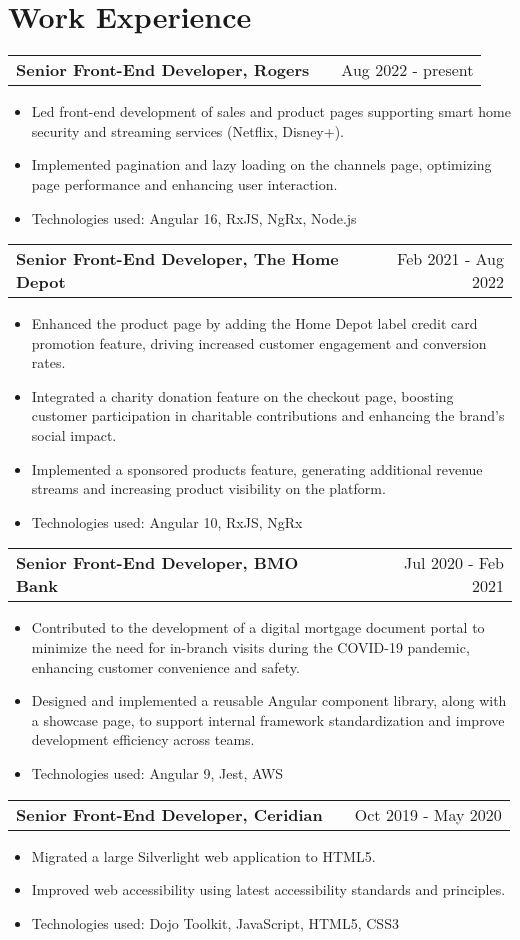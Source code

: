 \documentclass[a4paper,12pt]{article}
\makeatletter
\newenvironment{joblong}[2]
    {
    \begin{tabularx}{\linewidth}{@{}l X r@{}}
    \textbf{#1} & \hfill &  #2 \\[3.75pt]
    \end{tabularx}
    \begin{minipage}[t]{\linewidth}
    \begin{itemize}[nosep,after=\strut, leftmargin=1em, itemsep=3pt,label=--]
    }
    {
    \end{itemize}
    \end{minipage}    
    }
\makeatother
\begin{document}
\section{Work Experience}

\begin{joblong}{Senior Front-End Developer, Rogers}{Aug 2022 - present}
\item Led front-end development of sales and product pages supporting smart home security and streaming services (Netflix, Disney+).
\item Implemented pagination and lazy loading on the channels page, optimizing page performance and enhancing user interaction.
\item Technologies used:  Angular 16, RxJS, NgRx, Node.js
\end{joblong}

\begin{joblong}{Senior Front-End Developer, The Home Depot}{Feb 2021 - Aug 2022}
\item Enhanced the product page by adding the Home Depot label credit card promotion feature, driving increased customer engagement and conversion rates.
\item Integrated a charity donation feature on the checkout page, boosting customer participation in charitable contributions and enhancing the brand's social impact. 
\item Implemented a sponsored products feature, generating additional revenue streams and increasing product visibility on the platform.
\item Technologies used:  Angular 10, RxJS, NgRx
\end{joblong}

\begin{joblong}{Senior Front-End Developer, BMO Bank}{Jul 2020 - Feb 2021}
\item Contributed to the development of a digital mortgage document portal to minimize the need for in-branch visits during the COVID-19 pandemic, enhancing customer convenience and safety.
\item Designed and implemented a reusable Angular component library, along with a showcase page, to support internal framework standardization and improve development efficiency across teams.
\item Technologies used:  Angular 9, Jest, AWS
\end{joblong}

\begin{joblong}{Senior Front-End Developer, Ceridian}{Oct 2019 - May 2020}
\item Migrated a large Silverlight web application to HTML5.
\item Improved web accessibility using latest accessibility standards and principles. 
\item Technologies used:  Dojo Toolkit, JavaScript, HTML5, CSS3
\end{joblong}
\end{document}

